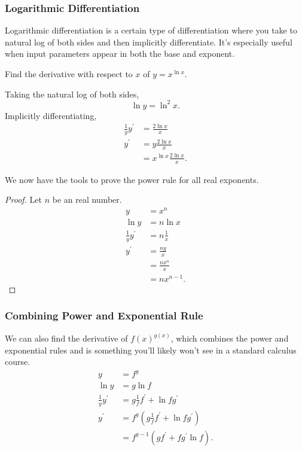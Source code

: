 \subsubsection{Logarithmic Differentiation}
Logarithmic differentiation is a certain type of differentiation where you take to natural log of both sides and then implicitly differentiate.
It's especially useful when input parameters appear in both the base and exponent.
\begin{example}
	Find the derivative with respect to $x$ of $y = x^{\ln{x}}$.
\end{example}
Taking the natural log of both sides,
\begin{equation*}
	\ln{y} = \ln^2{x}.
\end{equation*}
\indent
Implicitly differentiating,
\begin{align*}
	\frac{1}{y}y^\prime &= \frac{2\ln{x}}{x} \\
	y^\prime &= y\frac{2\ln{x}}{x} \\
	&= x^{\ln{x}}\frac{2\ln{x}}{x}.
\end{align*}

\noindent
We now have the tools to prove the power rule for all real exponents.
\begin{proof}
	Let $n$ be an real number.
	\begin{align*}
		y &= x^n \\
		\ln{y} &= n\ln{x} \\
		\frac{1}{y}y^\prime &= n\frac{1}{x} \\
		y^\prime &= \frac{ny}{x} \\
		&= \frac{nx^n}{x} \\
		&= nx^{n-1}.
	\end{align*}
\end{proof}

\subsubsection{Combining Power and Exponential Rule}
We can also find the derivative of $f(x)^{g(x)}$, which combines the power and exponential rules and is something you'll likely won't see in a standard calculus course.
\begin{align*}
	y &= f^g \\
	\ln{y} &= g\ln{f} \\
	\frac{1}{y}y^\prime &= g\frac{1}{f}f^\prime + \ln{f}g^\prime \\
	y^\prime &= f^g\left(g\frac{1}{f}f^\prime + \ln{f}g^\prime\right) \\
	&= f^{g-1}\left(gf^\prime + fg^\prime\ln{f}\right).
\end{align*}